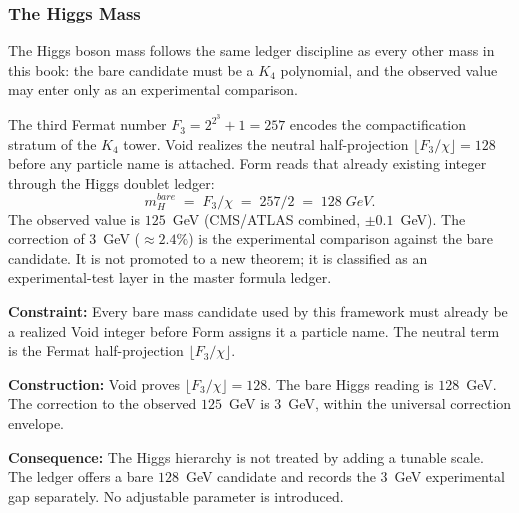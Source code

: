 \documentclass[11pt,a4paper]{book}
\def\text#1{#1}%
\begin{document}
\subsubsection*{The Higgs Mass}

The Higgs boson mass follows the same ledger discipline as every other mass
in this book: the bare candidate must be a $K_4$ polynomial, and the observed
value may enter only as an experimental comparison.

The third Fermat number $F_3 = 2^{2^3} + 1 = 257$ encodes the compactification
stratum of the $K_4$ tower. Void realizes the neutral half-projection
$\lfloor F_3/\chi\rfloor = 128$ before any particle name is attached. Form reads
that already existing integer through the Higgs doublet ledger:
\[
m_H^{\text{bare}} \;=\; F_3 / \chi \;=\; 257 / 2 \;=\; 128 \;\text{GeV}.
\]
The observed value is $125$~GeV (CMS/ATLAS combined, $\pm 0.1$~GeV).
The correction of $3$~GeV ($\approx 2.4\%$) is the experimental comparison
against the bare candidate.  It is not promoted to a new theorem; it is
classified as an experimental-test layer in the master formula ledger.

\textbf{Constraint:}
Every bare mass candidate used by this framework must already be a realized
Void integer before Form assigns it a particle name. The neutral term is the
Fermat half-projection $\lfloor F_3/\chi\rfloor$.

\textbf{Construction:}
Void proves $\lfloor F_3/\chi\rfloor = 128$.  The bare Higgs reading is $128$~GeV.  The
correction to the observed $125$~GeV is $3$~GeV, within the universal
correction envelope.

\textbf{Consequence:}
The Higgs hierarchy is not treated by adding a tunable scale. The ledger offers
a bare $128$~GeV candidate and records the $3$~GeV experimental gap separately.
No adjustable parameter is introduced.
\end{document}
